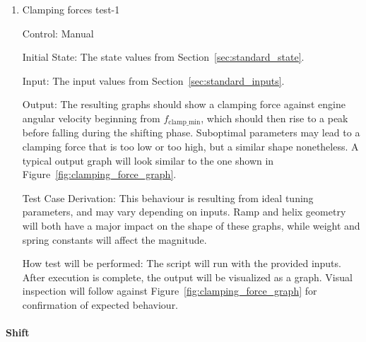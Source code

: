 \documentclass[12pt, titlepage]{article}
\begin{document}
\begin{enumerate}
  
  \item{Clamping forces test-1\\}
  
  Control: Manual
            
  Initial State: The state values from Section~\ref{sec:standard_state}.
  
  Input: The input values from Section~\ref{sec:standard_inputs}.
            
  Output: The resulting graphs should show a clamping force against engine angular velocity beginning from $f_\text{clamp\_min}$, which should then rise to a peak before falling during the shifting phase. Suboptimal parameters may lead to a clamping force that is too low or too high, but a similar shape nonetheless. A typical output graph will look similar to the one shown in Figure~\ref{fig:clamping_force_graph}.
  
  Test Case Derivation: This behaviour is resulting from ideal tuning parameters, and may vary depending on inputs. Ramp and helix geometry will both have a major impact on the shape of these graphs, while weight and spring constants will affect the magnitude.
  
  How test will be performed: The script will run with the provided inputs. After execution is complete, the output will be visualized as a graph. Visual inspection will follow against Figure~\ref{fig:clamping_force_graph} for confirmation of expected behaviour.
  
\end{enumerate}

\paragraph{Shift}
\end{document}
